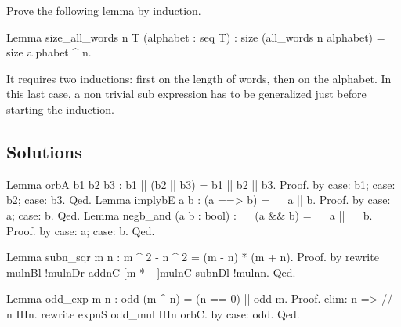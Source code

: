 \begin{Exercise}[label=ex:induction2,difficulty=2,title={Multiple induction}]

Prove the following lemma by induction.

\begin{coq}{}{}
Lemma size_all_words n T (alphabet : seq T) :
  size (all_words n alphabet) = size alphabet ^ n.
\end{coq}

It requires two inductions: first on the length of words,
then on the alphabet.  In this last case, a non trivial
sub expression has to be generalized just before starting
the induction.

\end{Exercise}

\subsection{Solutions}

\begin{Answer}[ref=ex:boolid]

\begin{coq}{}{}
Lemma orbA b1 b2 b3 : b1 || (b2 || b3) = b1 || b2 || b3.
Proof. by case: b1; case: b2; case: b3. Qed.
Lemma implybE a b : (a ==> b) = ~~ a || b.
Proof. by case: a; case: b. Qed.
Lemma negb_and (a b : bool) : ~~ (a && b) = ~~ a || ~~ b.
Proof. by case: a; case: b. Qed.
\end{coq}
\end{Answer}

\begin{Answer}[ref=ex:rewrite]

\begin{coq}{}{}
Lemma subn_sqr m n : m ^ 2 - n ^ 2 = (m - n) * (m + n).
Proof. by rewrite mulnBl !mulnDr addnC [m * _]mulnC subnDl !mulnn. Qed.
\end{coq}
\end{Answer}

\begin{Answer}[ref=ex:induction]

\begin{coq}{}{}
Lemma odd_exp m n : odd (m ^ n) = (n == 0) || odd m.
Proof.
elim: n => // n IHn.
rewrite expnS odd_mul {}IHn orbC.
by case: odd.
Qed.
\end{coq}
\end{Answer}

